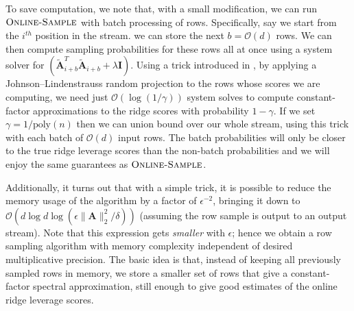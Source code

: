 \documentclass[11pt]{article}
\numberwithin{equation}{section}
\theoremstyle{definition}
\theoremstyle{plain}
\newcommand{\Oh}{\ensuremath{\mathcal{O}}}
\newcommand{\bv}[1]{\mathbf{#1}}
\newcommand{\norm}[1]{\|#1\|}
\newcommand{\poly}[1]{\text{poly}(#1)}
\begin{document}
To save computation, we note that, with a small modification, we can run $\textsc{Online-Sample}$ with batch processing of rows. Specifically, say we start from the $i^{th}$ position in the stream. we can store the next $b=\Oh(d)$ rows. We can then compute sampling probabilities for these rows all at once using a system solver for $(\bv{\tilde A}_{i + b}^T \bv{\tilde A}_{i + b} + \lambda \bv{I})$. Using a trick introduced in \cite{spielman2011graph}, by applying a Johnson--Lindenstrauss random projection to the rows whose scores we are computing, we need just $\Oh(\log(1/\gamma))$ system solves to compute constant-factor approximations to the ridge scores with probability $1-\gamma$. If we set $\gamma = 1/\poly{n}$ then we can union bound over our whole stream, using this trick with each batch of $\Oh(d)$ input rows.
The batch probabilities will only be closer to the true ridge leverage scores than the non-batch probabilities and we will enjoy the same guarantees as $\textsc{Online-Sample}$.

Additionally, it turns out that with a simple trick, it is possible to reduce the memory usage of the algorithm by a factor of $\epsilon^{-2}$,
bringing it down to $\Oh(d \log d \log(\epsilon\norm{\bv A}_2^2/\delta))$ (assuming the row sample is output to an output stream).
Note that this expression gets \emph{smaller} with $\epsilon$; hence we obtain a row sampling algorithm with memory complexity independent of desired multiplicative precision. The basic idea is that, instead of keeping all previously sampled rows in memory, we store a smaller set of rows that give a constant-factor spectral approximation, still enough to give good estimates of the online ridge leverage scores.
\end{document}
